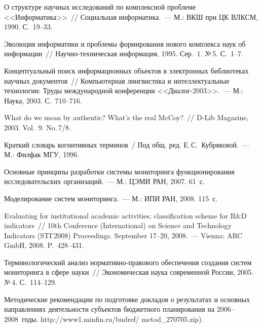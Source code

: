 \begin{multicols}{2}
{{\begin{thebibliography}{99}
     О структуре научных исследований по комплексной проблеме <<Информатика>>~// 
Социальная информатика.~--- М.: ВКШ при ЦК ВЛКСМ, 1990. С.~19--33.
     
     Эволюция информатики и проблемы формирования нового комплекса наук об 
информации~// Научно-техническая информация, 1995. Сер.~1. №\,5. С.~1--7.
     
     Концептуальный поиск информационных объектов в электронных библиотеках 
научных документов~// Компьютерная лингвистика и интеллектуальные технологии: Труды 
международной конференции <<Диалог-2003>>.~--- М.: Наука, 2003. С.~710--716.
     
     What do we mean by authentic? What's the real McCoy?~// D-Lib Magazine, 2003. Vol.~9. 
No.\,7/8.
     
     Краткий словарь когнитивных терминов~/ Под общ. ред. Е.\,С.~Кубряковой.~--- М.: 
Филфак МГУ, 1996.
     
     Основные принципы разработки системы мониторинга функционирования 
исследовательских организаций.~--- М.: ЦЭМИ РАН, 2007. 61~с.
     
     Моделирование систем мониторинга.~--- М.: ИПИ РАН, 2008.  115~с.
     
     Evaluating for institutional academic activities: classification scheme for R\&D indicators~// 
10th  Conference (International) on Science and Technology Indicators (STI'2008) Proceedings. 
September 17--20, 2008.~--- Vienna: ARC GmbH, 2008. P.~428--431.
     
     Терминологический анализ нор\-ма\-тив\-но-пра\-во\-во\-го обеспечения создания систем 
мониторинга в сфере науки~// Экономическая наука современной России, 2005. №\,4. 
С.~114--129.

\label{end\stat}
     
     Методические рекомендации по подготовке докладов о результатах и основных 
направлениях дея\-тель\-ности субъектов бюджетного планирования на 2006--2008~годы. 
{\sf http://www1.minfin.ru/budref/ metod\_270705.zip)}.
 
 
\end{thebibliography}
}
}
\end{multicols}